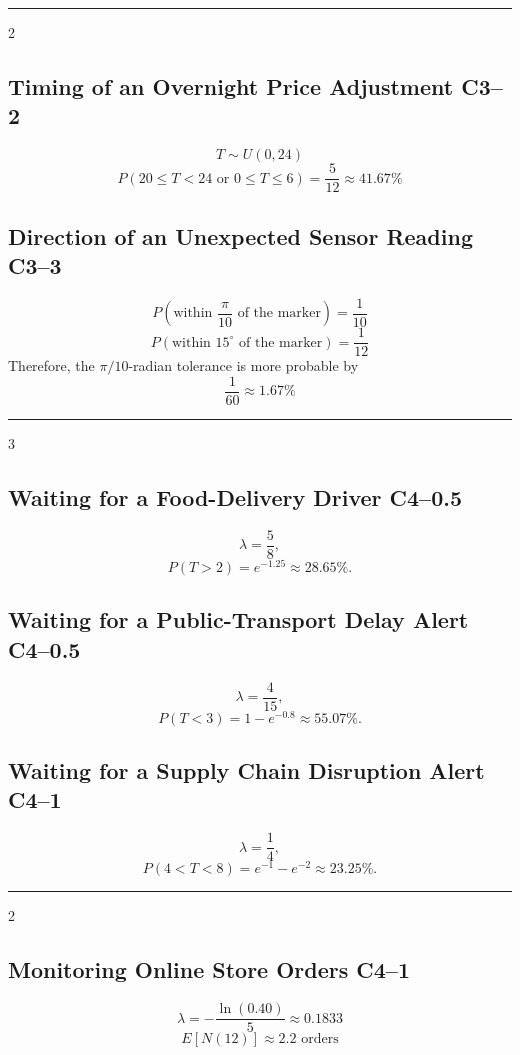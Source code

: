 {		\noindent\rule{\textwidth}{0.5pt}
		
		\begin{multicols}{2}
			\subsection{Timing of an Overnight Price Adjustment \hfill C3--2}
			\[
			T\sim U(0,24)
			\]\[
			\boxed{P(20\le T<24\text{ or }0\le T\le6)
			=\frac5{12}\approx41.67\%}
			\]

			\subsection{Direction of an Unexpected Sensor Reading \hfill C3--3}
			\[
			P\left(\text{within }\frac{\pi}{10}\text{ of the marker}\right)=\frac1{10}
			\]\[
			P\left(\text{within }15^\circ\text{ of the marker}\right)=\frac1{12}
			\]
			Therefore, the \(\pi/10\)-radian tolerance is more probable by
			\[
			\boxed{\frac1{60}\approx1.67\%}
			\]
		\end{multicols}
		
		\noindent\rule{\textwidth}{0.5pt}

		\begin{multicols}{3}
			\subsection{Waiting for a Food-Delivery Driver \hfill C4--0.5}
			\[
			\lambda=\frac58,
			\]\[
			\boxed{P(T>2)=e^{-1.25}\approx28.65\%}.
			\]

			\subsection{Waiting for a Public-Transport Delay Alert \hfill C4--0.5}
			\[
			\lambda=\frac4{15},
			\]\[
			\boxed{P(T<3)=1-e^{-0.8}\approx55.07\%}.
			\]

			\subsection{Waiting for a Supply Chain Disruption Alert \hfill C4--1}
			\[
			\lambda=\frac14,
			\]\[
			\boxed{P(4<T<8)=e^{-1}-e^{-2}\approx23.25\%}.
			\]
		\end{multicols}
		
		\noindent\rule{\textwidth}{0.5pt}

		\begin{multicols}{2}
			\subsection{Monitoring Online Store Orders \hfill C4--1}
			\[
			\lambda=-\frac{\ln(0.40)}5\approx0.1833
			\]\[
			\boxed{E[N(12)]\approx2.2\text{ orders}}
			\]


\end{multicols}}
